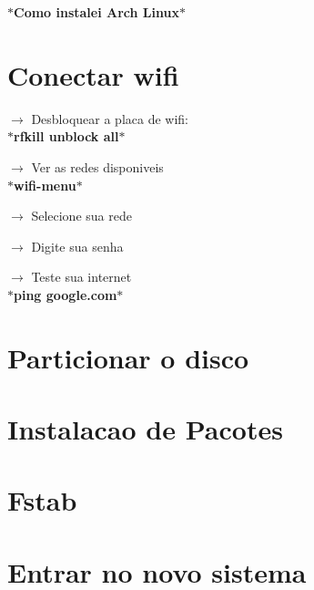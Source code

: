 \documentclass[12pt, a4paper] {article}
\begin{document}
	\begin{center}
		\Large\textbf{$\ast$Como instalei Arch Linux$\ast$}
	\end{center}
	
	\section{Conectar wifi}
	$\rightarrow$ Desbloquear a placa de wifi:\\
	\indent\indent\hookrightarrow\textbf{$\ast$rfkill unblock all$\ast$}

	$\rightarrow$ Ver as redes disponiveis\\
	\indent\indent\hookrightarrow\textbf{$\ast$wifi-menu$\ast$}

	$\rightarrow$ Selecione sua rede
	
	$\rightarrow$ Digite sua senha

	$\rightarrow$ Teste sua internet\\
	\indent\indent\hookrightarrow\textbf{$\ast$ping google.com$\ast$}

	\section{Particionar o disco}
	
	\section{Instalacao de Pacotes}

	\section{Fstab}

	\section{Entrar no novo sistema}
\end{document}
